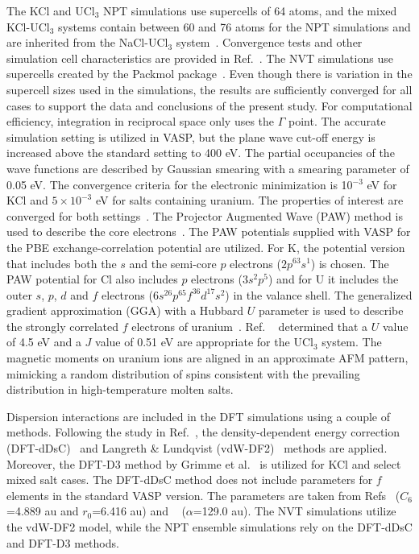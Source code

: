 \documentclass[preprint,3p,10pt,twocolumn,number,sort&compress]{elsarticle}
\begin{document}
The KCl and UCl$_3$ NPT simulations use supercells of 64 atoms, and the mixed KCl-UCl$_3$ systems contain between 60 and 76 atoms for the NPT simulations and are inherited from the NaCl-UCl$_3$ system~\cite{Andersson}. Convergence tests and other simulation cell characteristics are provided in Ref.~\cite{Andersson}.  
The NVT simulations use supercells created by the Packmol package~\cite{packmol}. Even though there is variation in the supercell sizes used in the simulations, the results are sufficiently converged for all cases to support the data and conclusions of the present study. 
For computational efficiency, integration in reciprocal space only uses the $\Gamma$ point. 
The accurate simulation setting is utilized in VASP, but the plane wave cut-off energy is increased above the standard setting to 400 eV. The partial occupancies of the wave functions are described by Gaussian smearing with a smearing parameter of 0.05 eV. The convergence criteria for the electronic minimization is 10$^{-3}$ eV for KCl and $5\times10^{-3}$ eV for salts containing uranium.
The properties of interest are converged for both settings~\cite{Andersson}. The Projector Augmented Wave (PAW) method is used to describe the core electrons~\cite{PAW1,PAW2}. The PAW potentials supplied with VASP for the PBE exchange-correlation potential are utilized. For K, the potential version that includes both the $s$ and the semi-core $p$ electrons ($2p^63s^1$) is chosen. The PAW potential for Cl also includes $p$ electrons ($3s^2p^5$) and for U it includes the outer $s$, $p$, $d$ and $f$ electrons ($6s^26p^65f^36d^17s^2$) in the valance shell.
The generalized gradient approximation (GGA) with a Hubbard $U$ parameter is used to describe the strongly correlated $f$ electrons of uranium~\cite{Andersson}. 
Ref. ~\cite{Andersson} determined that a $U$ value of 4.5 eV and a $J$ value of 0.51 eV are appropriate for the UCl$_3$ system. 
The magnetic moments on uranium ions are aligned in an approximate AFM pattern, mimicking a random distribution of spins consistent with the prevailing distribution in high-temperature molten salts.

Dispersion interactions are included in the DFT simulations using a couple of methods. 
Following the study in Ref.~\cite{Andersson}, the density-dependent energy correction (DFT-dDsC)~\cite{Steinmann2011,Steinmann2} and Langreth \& Lundqvist (vdW-DF2)~\cite{Dion2004,Klimes2010} methods are applied. Moreover, the DFT-D3 method by Grimme et al.~\cite{Grimme} is utilized for KCl and select mixed salt cases. The DFT-dDsC method does not include parameters for $f$ elements in the standard VASP version. The parameters are taken from Refs~\cite{Kim} ($C_6$=4.889 au and $r_0$=6.416 au) and ~\cite{pol} ($\alpha$=129.0 au). The NVT simulations utilize the vdW-DF2 model, while the NPT ensemble simulations rely on the DFT-dDsC and DFT-D3 methods.
\end{document}
